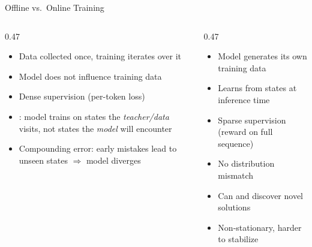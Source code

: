 \begin{frame}{Offline vs.\ Online Training}
  \vspace{-0.2em}
  \begin{columns}[T]
    \begin{column}{0.47\textwidth}
      \begin{itemize}[nosep]
        \item Data collected once, training iterates over it
        \item Model does not influence training data
        \item Dense supervision (per-token loss)
        \item {}: model trains on states the \emph{teacher/data} visits, not states the \emph{model} will encounter
        \item Compounding error: early mistakes lead to unseen states $\Rightarrow$ model diverges
      \end{itemize}
    \end{column}
    \begin{column}{0.47\textwidth}
      \begin{itemize}[nosep]
        \item Model generates its own training data
        \item Learns from states  at inference time
        \item Sparse supervision (reward on full sequence)
        \item No distribution mismatch
        \item Can  and discover novel solutions
        \item Non-stationary, harder to stabilize
      \end{itemize}
    \end{column}
  \end{columns}
\end{frame}

